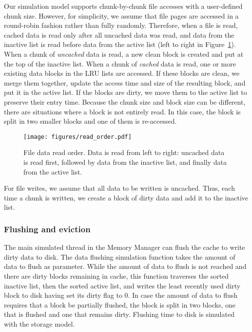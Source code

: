 \documentclass[conference]{IEEEtran}
\begin{document}
    Our simulation model supports chunk-by-chunk file accesses
    with a user-defined chunk size. However, for simplicity, we assume that file pages are 
    accessed in a round-robin fashion rather than fully randomly. 
    Therefore, when a file is read, cached data is read only after all uncached data was read, and data from the inactive list is read
    before data from the active list
    (left to right in Figure~\ref{fig:read_order}).
    When a chunk of \emph{uncached} data is read, a new clean block is created 
    and put at the top of the inactive list. 
    When a chunk of \emph{cached} data is read, one or more existing data blocks in the LRU lists are accessed.
    If these blocks are clean, we merge them together, update the access time and size of the resulting block, 
    and put it in the active list. 
    If the blocks are dirty, we move them to the active list to preserve their entry time. 
    Because the chunk size and block size can be different, there are situations
    where a block is not entirely read. 
    In this case, the block is split in two smaller blocks and one of them is re-accessed.
    \begin{figure}
           \centering
           \texttt{[image: figures/read\_order.pdf]}
           \caption{File data read order. Data is read from left to right: uncached data 
           is read first, followed by data from the inactive list, and finally data from the active list.}
           \label{fig:read_order}
    \end{figure}    

    For file writes, we assume that all data to be written is 
    uncached. Thus, each time a chunk is written, we create a block of dirty data 
    and add it to the inactive list.

    \subsubsection{Flushing and eviction}

    The main simulated thread in the Memory Manager can flush the
    cache to write dirty data to disk. The data flushing simulation
    function takes the amount of data to flush as parameter. While
    the amount of data to flush is not reached and there are dirty
    blocks remaining in cache, this function traverses the sorted
    inactive list, then the sorted active list, and writes the
    least recently used dirty block to disk having set its dirty
    flag to 0. In case the amount of data to flush requires that a
    block be partially flushed, the block is split in two blocks,
    one that is flushed and one that remains dirty. Flushing time
    to disk is simulated with the storage model.
\end{document}
